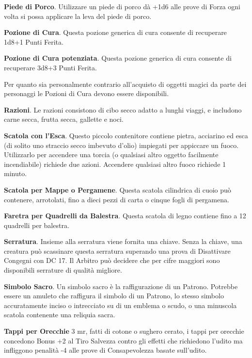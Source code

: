 \documentclass[12pt,a4paper,twoside,openany]{book}
\begin{document}
\begin{multicols}{2}
\textbf{Piede di Porco}. Utilizzare un piede di porco dà +1d6 alle prove di Forza ogni volta si possa applicare la leva del piede di porco.

\textbf{Pozione di Cura}. Questa pozione generica di cura consente di recuperare 1d8+1 Punti Ferita.

\textbf{Pozione di Cura potenziata}. Questa pozione generica di cura consente di recuperare 3d8+3 Punti Ferita.

\begin{changemargin}{0.3cm}{0.3cm}\begin{narratore} Per quanto sia personalmente contrario all'acquisto di oggetti magici da parte dei personaggi le Pozioni di Cura devono essere disponibili.
\end{narratore}\end{changemargin}

\textbf{Razioni}. Le razioni consistono di cibo secco adatto a lunghi viaggi, e includono carne secca, frutta secca, gallette e noci.

\textbf{Scatola con l’Esca}. Questo piccolo contenitore contiene pietra, acciarino ed esca (di solito uno straccio secco imbevuto d’olio) impiegati per appiccare un fuoco. Utilizzarlo per accendere una torcia (o qualsiasi altro oggetto facilmente incendiabile) richiede due azioni. Accendere qualsiasi altro fuoco richiede 1 minuto.

\textbf{Scatola per Mappe o Pergamene}. Questa scatola cilindrica di cuoio può contenere, arrotolati, fino a dieci pezzi di carta o cinque fogli di pergamena.

\textbf{Faretra per Quadrelli da Balestra}. Questa scatola di legno contiene fino a 12 quadrelli per balestra.

\textbf{Serratura}. Insieme alla serratura viene fornita una chiave. Senza la chiave, una creatura può scassinare questa serratura superando una prova di Disattivare Congegni con DC 17. Il Arbitro può decidere che per cifre maggiori sono disponibili serrature di qualità migliore.

\textbf{Simbolo Sacro}. Un simbolo sacro è la raffigurazione di un Patrono. Potrebbe essere un amuleto che raffigura il simbolo di un Patrono, lo stesso simbolo accuratamente inciso o intrecciato su di un emblema o scudo, o una minuscola scatola contenente una reliquia sacra.

\textbf{Tappi per Orecchie} 3 mr, fatti di cotone o sughero cerato, i tappi per orecchie concedono Bonus +2 al Tiro Salvezza contro gli effetti che richiedono l'udito ma infliggono penalità -4 alle prove di Consapevolezza basate sull'udito.


\end{multicols}
\end{document}
